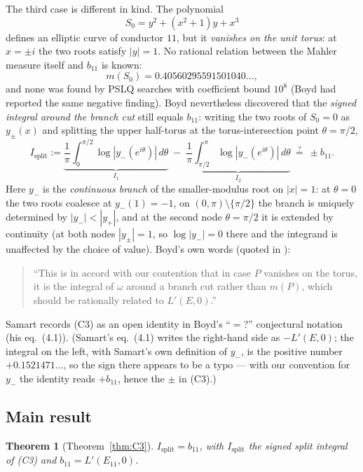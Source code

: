 \documentclass[preprint,12pt]{elsarticle}
\newtheorem*{theorem*}{Theorem}
\theoremstyle{definition}
\theoremstyle{remark}
\begin{document}
The third case is different in kind. The polynomial
\[
  S_0=y^2+(x^2+1)y+x^3
\]
defines an elliptic curve of conductor $11$, but it \emph{vanishes on the
unit torus}: at $x=\pm i$ the two roots satisfy $|y|=1$. No rational
relation between the Mahler measure itself and $b_{11}$ is known:
\[
  m(S_0)=0.40560295591501040\ldots,
\]
and none was found by PSLQ searches with coefficient bound $10^8$ (Boyd had
reported the same negative finding). Boyd nevertheless discovered that the \emph{signed
integral around the branch cut} still equals $b_{11}$: writing the two roots
of $S_0=0$ as $y_\pm(x)$ and splitting the upper half-torus at the
torus-intersection point $\theta=\pi/2$,
\[
  I_{\mathrm{split}}
  :=\underbrace{\frac1\pi\int_0^{\pi/2}\log|y_-(e^{i\theta})|\,d\theta}_{I_1}
  \;-\;\underbrace{\frac1\pi\int_{\pi/2}^{\pi}\log|y_-(e^{i\theta})|\,d\theta}_{I_2}
  \ \stackrel?=\ \pm b_{11}. \tag{C3}
\]
Here $y_-$ is the \emph{continuous branch} of the smaller-modulus root on
$|x|=1$: at $\theta=0$ the two roots coalesce at $y_-(1)=-1$, on
$(0,\pi)\setminus\{\pi/2\}$ the branch is uniquely determined by
$|y_-|<|y_+|$, and at the second node $\theta=\pi/2$ it is extended by
continuity (at both nodes $|y_\pm|=1$, so $\log|y_-|=0$ there and the
integrand is unaffected by the choice of value).
Boyd's own words (quoted in \cite{Samart2023}):
\begin{quote}
  ``This is in accord with our contention that in case $P$ vanishes on the
  torus, it is the integral of $\omega$ around a branch cut rather than
  $m(P)$, which should be rationally related to $L'(E,0)$.''
\end{quote}
Samart \cite{Samart2023} records (C3) as an open identity in Boyd's
``$=$?'' conjectural notation (his eq.~(4.1)).
(Samart's eq.~(4.1) writes the right-hand side as $-L'(E,0)$; the integral
on the left, with Samart's own definition of $y_-$, is the positive number
$+0.1521471\ldots$, so the sign there appears to be a typo --- with our
convention for $y_-$ the identity reads $+b_{11}$, hence the $\pm$ in
\textup{(C3)}.)

\subsection{Main result}

\begin{theorem*}[Theorem~\ref{thm:C3}]
$I_{\mathrm{split}}=b_{11}$, with $I_{\mathrm{split}}$ the signed split
integral of \textup{(C3)} and $b_{11}=L'(E_{11},0)$.
\end{theorem*}
\end{document}
